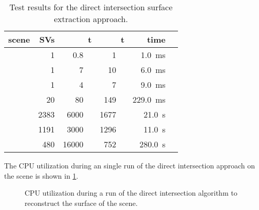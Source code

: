 \begin{table}
	\centering
	\begin{tabular}{lrrrrr}
		scene         &  SVs &                 t\sub{in} &               t\sub{out} &                               {time} &  \\
		\midrule
		\cubes        &    1 & \SI{  0.8}{\kilo\nothing} & \SI{   1}{\kilo\nothing} &            \SI{  1.0}{\milli\second} &  \\
		\cylindersd   &    1 & \SI{    7}{\kilo\nothing} & \SI{  10}{\kilo\nothing} &            \SI{  6.0}{\milli\second} &  \\
		\cylinders    &    1 & \SI{    4}{\kilo\nothing} & \SI{   7}{\kilo\nothing} &            \SI{  9.0}{\milli\second} &  \\
		\cylinderhead &   20 & \SI{   80}{\kilo\nothing} & \SI{ 149}{\kilo\nothing} &            \SI{229.0}{\milli\second} &  \\
		\impeller     & 2383 & \SI{ 6000}{\kilo\nothing} & \SI{1677}{\kilo\nothing} & \SI{ 21.0}{      \second}\phantom{m} &  \\
		\impellerhalf & 1191 & \SI{ 3000}{\kilo\nothing} & \SI{1296}{\kilo\nothing} & \SI{ 11.0}{      \second}\phantom{m} &  \\
		\turbine      &  480 & \SI{16000}{\kilo\nothing} & \SI{ 752}{\kilo\nothing} & \SI{280.0}{      \second}\phantom{m} &
	\end{tabular}
	\caption{
		Test results for the direct intersection surface extraction approach.
	}
	\label{tbl:direct_intersection_results}
\end{table}

The CPU utilization during an single run of the direct intersection approach on the \impeller scene is shown in \cref{fig:di_cpu}.

\begin{figure}
	\centering
	\caption{
		CPU utilization during a run of the direct intersection algorithm to reconstruct the surface of the \impeller scene.
	}
	\label{fig:di_cpu}
\end{figure}

